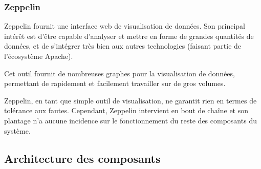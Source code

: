 \documentclass[a4paper,oneside,10pt]{article}
\begin{document}
\subsubsection{Zeppelin}
Zeppelin fournit une interface web de visualisation de données. Son principal intérêt est d'être capable d'analyser et mettre en forme de grandes quantités de données, et de s'intégrer très bien aux autres technologies (faisant partie de l'écosystème Apache).

Cet outil fournit de nombreuses graphes pour la visualisation de données, permettant de rapidement et facilement travailler sur de gros volumes.

Zeppelin, en tant que simple outil de visualisation, ne garantit rien en termes de tolérance aux fautes. Cependant, Zeppelin intervient en bout de chaîne et son plantage n'a aucune incidence sur le fonctionnement du reste des composants du système. 

\subsection{Architecture des composants}
\end{document}
